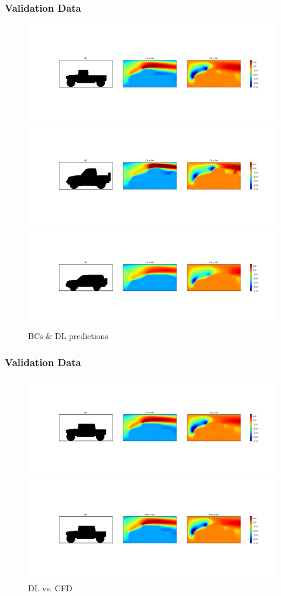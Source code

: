 \documentclass{beamer}
\begin{document}
\begin{frame}
\frametitle{Validation Data}
\begin{figure}[!htb]%
\vspace{-0.20cm}
\includegraphics[height=0.20\linewidth, trim = 5.80cm 5.25cm 1.3cm 6.50cm, clip]{../../../plots/plots/cars/comparison/montage_car_DL_01.png}%
        
\includegraphics[height=0.20\linewidth, trim = 5.80cm 5.25cm 1.3cm 6.50cm, clip]{../../../plots/plots/cars/comparison/montage_car_DL_27.png}%

\includegraphics[height=0.20\linewidth, trim = 5.80cm 5.25cm 1.3cm 6.50cm, clip]{../../../plots/plots/cars/comparison/montage_car_DL_00.png}%
\vspace{-0.35cm}
\caption{BCs \& DL predictions}
\end{figure}
\end{frame}


\begin{frame}
\frametitle{Validation Data}
\begin{figure}[!htb]%
\includegraphics[height=0.28\linewidth, trim = 5.80cm 4.25cm 1.3cm 4.50cm, clip]{../../../plots/plots/cars/comparison/montage_car_DL_04.png}%
        
\includegraphics[height=0.28\linewidth, trim = 5.80cm 4.25cm 1.3cm 4.50cm, clip]{../../../plots/plots/cars/comparison/montage_car_CFD_04.png}
\caption{DL vs. CFD}
\end{figure}
\end{frame}
\end{document}
